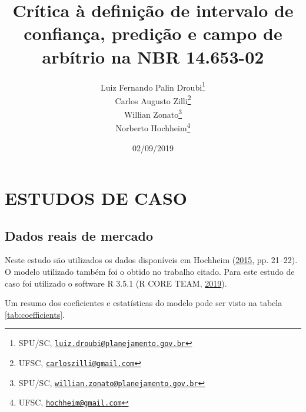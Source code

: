 \documentclass[a4paper, 12pt]{article}
\title{Crítica à definição de intervalo de confiança, predição e campo de
arbítrio na NBR 14.653-02}
\author{Luiz Fernando Palin Droubi\footnote{SPU/SC,
  \href{mailto:luiz.droubi@planejamento.gov.br}{\nolinkurl{luiz.droubi@planejamento.gov.br}}} \\ Carlos Augusto Zilli\footnote{UFSC,
  \href{mailto:carloszilli@gmail.com}{\nolinkurl{carloszilli@gmail.com}}} \\ Willian Zonato\footnote{SPU/SC,
  \href{mailto:willian.zonato@planejamento.gov.br}{\nolinkurl{willian.zonato@planejamento.gov.br}}} \\ Norberto Hochheim\footnote{UFSC,
  \href{mailto:hochheim@gmail.com}{\nolinkurl{hochheim@gmail.com}}}}
\date{02/09/2019}
\begin{document}
\maketitle

\hypertarget{estudos-de-caso}{%
\section{ESTUDOS DE CASO}\label{estudos-de-caso}}

\hypertarget{dados-reais-de-mercado}{%
\subsection{Dados reais de mercado}\label{dados-reais-de-mercado}}

Neste estudo são utilizados os dados disponíveis em Hochheim
(\protect\hyperlink{ref-hochheim}{2015}, pp. 21--22). O modelo utilizado
também foi o obtido no trabalho citado. Para este estudo de caso foi
utilizado o software R 3.5.1 (R CORE TEAM,
\protect\hyperlink{ref-R}{2019}).

\begin{table}[t]

\caption{\label{tab:coefficients}Coeficientes e estatísticas do modelo adotado.}
\centering
{}
\end{table}

Um resumo dos coeficientes e estatísticas do modelo pode ser visto na
tabela \ref{tab:coefficients}.
\end{document}
